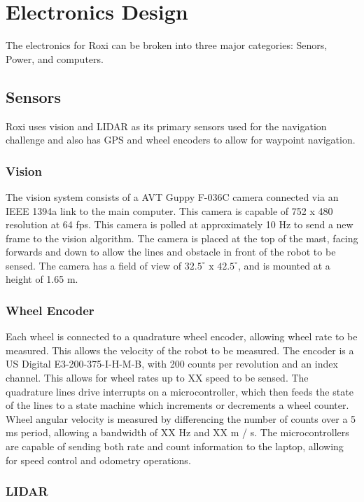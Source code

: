 \section{Electronics Design}

The electronics for Roxi can be broken into three major categories: Senors, Power, and computers.

\subsection{Sensors}

Roxi uses vision and LIDAR as its primary sensors used for the navigation challenge and also has GPS and wheel encoders to allow for waypoint navigation.

\subsubsection{Vision}

The vision system consists of a AVT Guppy F-036C camera connected via an IEEE 1394a link to the main computer. This camera is capable of 752 x 480 resolution at 64 fps. This camera is polled at approximately 10 Hz to send a new frame to the vision algorithm.  The camera is placed at the top of the mast, facing forwards and down to allow the lines and obstacle in front of the robot to be sensed. The camera has a field of view of $32.5^{\circ} \text{ x } 42.5^{\circ}$, and is mounted at a height of 1.65 m.

\subsubsection{Wheel Encoder}

Each wheel is connected to a quadrature wheel encoder, allowing wheel rate to be measured. This allows the velocity of the robot to be measured. The encoder is a US Digital E3-200-375-I-H-M-B, with 200 counts per revolution and an index channel. This allows for wheel rates up to XX speed to be sensed. The quadrature lines drive interrupts on a microcontroller, which then feeds the state of the lines to a state machine which increments or decrements a wheel counter. Wheel angular velocity is measured by differencing the number of counts over a 5 ms period, allowing a bandwidth of XX Hz and XX m / s. The microcontrollers are capable of sending both rate and count information to the laptop, allowing for speed control and odometry operations.

\subsubsection{LIDAR}

